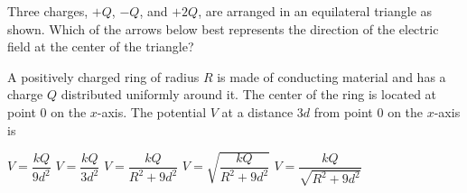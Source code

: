 \documentclass{../../oss-apphys-exam}
\begin{document}
\begin{multicols*}{2}
\begin{questions}
    \question Three charges, $+Q$, $-Q$, and $+2Q$, are arranged in an
    equilateral triangle as shown. Which of the arrows below best represents the
    direction of the electric field at the center of the triangle?
    \begin{center}
      \vspace{-.1in}
    \end{center}
    \begin{choices}
      \choice {\Huge$\downarrow$}
      \choice {\Huge$\uparrow$}
      \choice {\Huge$\searrow$}
      \choice {\Huge$\swarrow$}
      \choice {\Huge$\nearrow$}
    \end{choices}
    \columnbreak
    
   
    \question A positively charged ring of radius $R$ is made of conducting
    material and has a charge $Q$ distributed uniformly around it. The center of
    the ring is located at point $0$ on the $x$-axis. The potential $V$ at a
    distance $3d$ from point $0$ on the $x$-axis is
    \begin{center}
    \end{center}
    \begin{choices}
      \choice $V=\dfrac{kQ}{9d^2}$
      \choice $V=\dfrac{kQ}{3d^2}$
      \choice $V=\dfrac{kQ}{R^2+9d^2}$
      \choice $V=\sqrt{\dfrac{kQ}{R^2+9d^2}}$
      \choice $V=\dfrac{kQ}{\sqrt{R^2+9d^2}}$
    \end{choices}
    \vspace{.7in}
      

\end{questions}
\end{multicols*}
\end{document}
